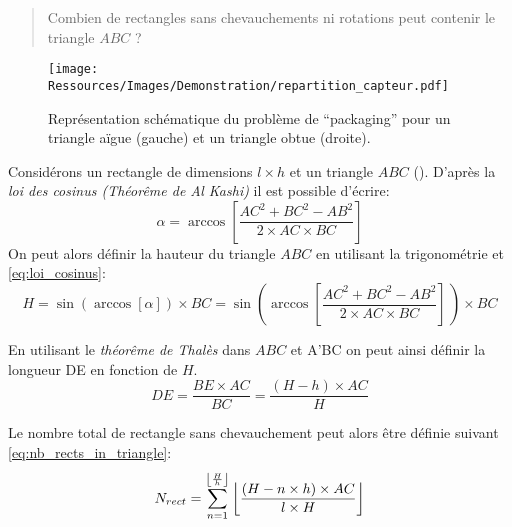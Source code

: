 
\blockquote{Combien de rectangles sans chevauchements ni rotations peut contenir le triangle $ABC$ ?}

\begin{figure}
    \centering
    \texttt{[image: Ressources/Images/Demonstration/repartition\_capteur.pdf]}
    \caption[Représentation schématique du problème de \enquote{packaging}]
            {Représentation schématique du problème de \enquote{packaging} pour
             un triangle aïgue (gauche) et un triangle obtue (droite).
             \label{fig:rects_in_triangle}}
\end{figure}

Considérons un rectangle de dimensions $l \times h$ et un triangle $ABC$ ().
D’après la \textit{loi des cosinus (Théorême de Al Kashi)} il est possible d’écrire:
\begin{equation}
        \alpha = \arccos \left[\frac{AC^{2} + BC^{2} - AB^{2}}{2 \times AC \times BC}\right]
    \label{eq:loi_cosinus}
\end{equation}
\noindent On peut alors définir la hauteur du triangle $ABC$ en utilisant la trigonométrie et
\eqref{eq:loi_cosinus}:
\begin{equation}
        H = \sin (\arccos[\alpha]) \times BC%
          =\sin \left(\arccos \left[\frac{AC^{2} + BC^{2} - AB^{2}}{2 \times AC \times BC}\right]\,\right) \times BC
    \label{fig:height_triangle}
\end{equation}

\noindent En utilisant le \textit{théorême de Thalès} dans $ABC$ et A’BC on peut ainsi définir la longueur DE
en fonction de $H$.
\begin{equation}
    DE = \frac{BE \times AC}{BC} = \frac{(H - h) \times AC}{H}
\end{equation}

\noindent Le nombre total de rectangle sans chevauchement peut alors être définie suivant \eqref{eq:nb_rects_in_triangle}:
\begin{equation}
    N_{rect} = \sum_{n = 1}^{\floor*{\frac{H}{h}}} \, \floor*{\frac{(H - n \times h) \times AC}{l \times H}}
    \label{eq:nb_rects_in_triangle}
\end{equation}

